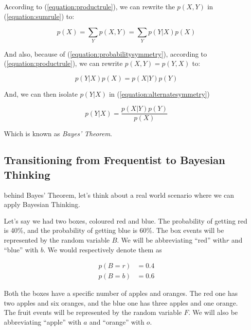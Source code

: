 \documentclass{tufte-handout}
\begin{document}
According to (\ref{equation:productrule}), we can rewrite the $p(X, Y)$ in
(\ref{equation:sumrule}) to:

\begin{equation}
  p(X) = \sum\limits_{Y}p(X, Y) = \sum\limits_{Y}p(Y|X)p(X)
\end{equation}

And also, because of (\ref{equation:probabilitysymmetry}), according to
(\ref{equation:productrule}), we can rewrite $p(X, Y) = p(Y, X)$ to:

\begin{equation}\label{equation:alternatesymmetry}
  p(Y|X)p(X) = p(X|Y)p(Y)
\end{equation}

And, we can then isolate $p(Y|X)$ in (\ref{equation:alternatesymmetry})

\begin{equation}
  p(Y|X) = \frac{p(X|Y)p(Y)}{p(X)}
\end{equation}

Which is known as \emph{Bayes' Theorem}.

\subsection{Transitioning from Frequentist to Bayesian Thinking}

 behind Bayes' Theorem, let's think about a real world scenario where we can apply Bayesian Thinking.

Let's say we had two boxes, coloured red and blue. The probability of getting red is 40\%, and the probability of getting blue is 60\%. The box events will be represented by the random variable $B$. We will be abbreviating ``red'' with$r$ and ``blue'' with $b$. We would respectively denote them as

\begin{align}
  p(B = r) &= 0.4 \\
  p(B = b) &= 0.6
\end{align}

Both the boxes have a specific number of apples and oranges. The red one has two apples and six oranges, and the blue one has three apples and one orange. The fruit events will be represented by the random variable $F$. We will also be abbreviating ``apple'' with $a$ and ``orange'' with $o$.
\end{document}
